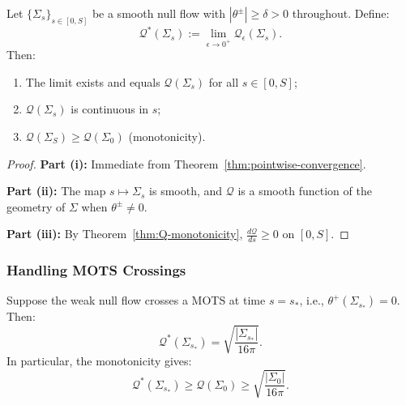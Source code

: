 \begin{proposition}
\label{prop:smooth-flow-convergence}
Let $\{\Sigma_s\}_{s \in [0, S]}$ be a smooth null flow with $|\theta^\pm| \geq \delta > 0$ throughout. Define:
\begin{equation}
\mathcal{Q}^*(\Sigma_s) := \lim_{\epsilon \to 0^+} \mathcal{Q}_\epsilon(\Sigma_s).
\end{equation}
Then:
\begin{enumerate}[label=(\roman*)]
\item The limit exists and equals $\mathcal{Q}(\Sigma_s)$ for all $s \in [0, S]$;
\item $\mathcal{Q}(\Sigma_s)$ is continuous in $s$;
\item $\mathcal{Q}(\Sigma_S) \geq \mathcal{Q}(\Sigma_0)$ (monotonicity).
\end{enumerate}
\end{proposition}

\begin{proof}
\textbf{Part (i):} Immediate from Theorem~\ref{thm:pointwise-convergence}.

\textbf{Part (ii):} The map $s \mapsto \Sigma_s$ is smooth, and $\mathcal{Q}$ is a smooth function of the geometry of $\Sigma$ when $\theta^\pm \neq 0$.

\textbf{Part (iii):} By Theorem~\ref{thm:Q-monotonicity}, $\frac{d\mathcal{Q}}{ds} \geq 0$ on $[0, S]$.
\end{proof}

\subsubsection{Handling MOTS Crossings}

\begin{proposition}
\label{prop:mots-crossing}
Suppose the weak null flow crosses a MOTS at time $s = s_*$, i.e., $\theta^+(\Sigma_{s_*}) = 0$. Then:
\begin{equation}
\mathcal{Q}^*(\Sigma_{s_*}) = \sqrt{\frac{|\Sigma_{s_*}|}{16\pi}}.
\end{equation}
In particular, the monotonicity gives:
\begin{equation}
\mathcal{Q}^*(\Sigma_{s_*}) \geq \mathcal{Q}(\Sigma_0) \geq \sqrt{\frac{|\Sigma_0|}{16\pi}}.
\end{equation}
\end{proposition}

